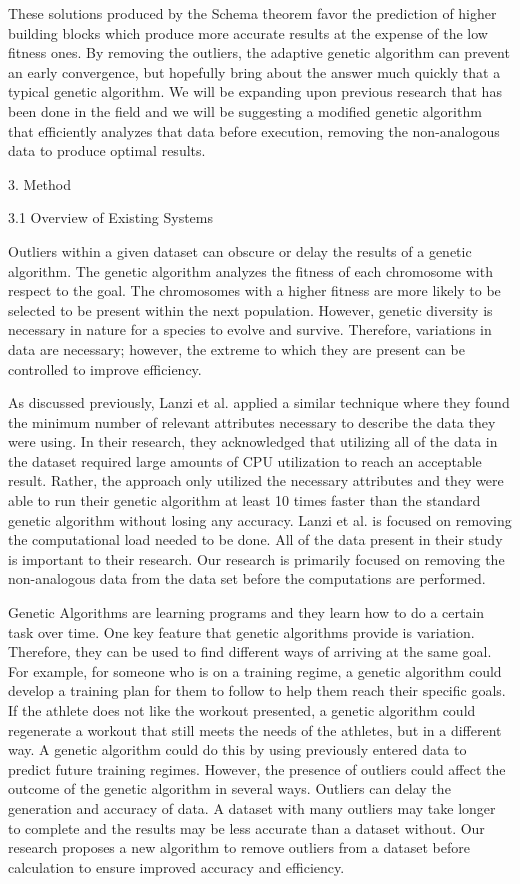 \documentclass[conference]{IEEEtran}
\begin{document}
\large These solutions produced by the Schema theorem favor the prediction of higher building blocks which produce more accurate results at the expense of the low fitness ones. By removing the outliers, the adaptive genetic algorithm can prevent an early convergence, but hopefully bring about the answer much quickly that a typical genetic algorithm. We will be expanding upon previous research that has been done in the field and we will be suggesting a modified genetic algorithm that efficiently analyzes that data before execution, removing the non-analogous data to produce optimal results. 

3. Method

3.1 Overview of Existing Systems

Outliers within a given dataset can obscure or delay the results of a genetic algorithm. The genetic algorithm analyzes the fitness of each chromosome with respect to the goal. The chromosomes with a higher fitness are more likely to be selected to be present within the next population. However, genetic diversity is necessary in nature for a species to evolve and survive. Therefore, variations in data are necessary; however, the extreme to which they are present can be controlled to improve efficiency.

As discussed previously, Lanzi et al. applied a similar technique where they found the minimum number of relevant attributes necessary to describe the data they were using. In their research, they acknowledged that utilizing all of the data in the dataset required large amounts of CPU utilization to reach an acceptable result. Rather, the approach only utilized the necessary attributes and they were able to run their genetic algorithm at least 10 times faster than the standard genetic algorithm without losing any accuracy. Lanzi et al. is focused on removing the computational load needed to be done. All of the data present in their study is important to their research. Our research is primarily focused on removing the non-analogous data from the data set before the computations are performed.

Genetic Algorithms are learning programs and they learn how to do a certain task over time. One key feature that genetic algorithms provide is variation. Therefore, they can be used to find different ways of arriving at the same goal. For example, for someone who is on a training regime, a genetic algorithm could develop a training plan for them to follow to help them reach their specific goals. If the athlete does not like the workout presented, a genetic algorithm could regenerate a workout that still meets the needs of the athletes, but in a different way. A genetic algorithm could do this by using previously entered data to predict future training regimes. However, the presence of outliers could affect the outcome of the genetic algorithm in several ways. Outliers can delay the generation and accuracy of data. A dataset with many outliers may take longer to complete and the results may be less accurate than a dataset without. Our research proposes a new algorithm to remove outliers from a dataset before calculation to ensure improved accuracy and efficiency. 
\end{document}
